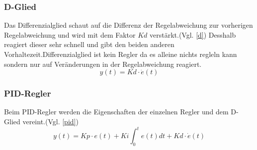 \documentclass[12pt,a4paper, ngerman]{article}
\begin{document}
\subsubsection{D-Glied}
Das Differenzialglied schaut auf die Differenz der Regelabweichung zur vorherigen Regelabweichung und wird mit dem Faktor $Kd$ verstärkt.(Vgl. \ref{d}) Desshalb reagiert dieser sehr schnell und gibt den beiden anderen Vorhaltezeit.Differenzialglied ist kein Regler da es alleine nichts regleln kann sondern nur auf Veränderungen in der Regelabweichung reagiert.\cite{website:rn-wissen_Regelungstechnik}\\
\begin{equation}\label{d}
y(t)=Kd\cdot \dot{e}(t)
\end{equation}

\subsubsection{PID-Regler}
Beim PID-Regler werden die Eigenschaften der einzelnen Regler und dem D-Glied vereint.(Vgl. \ref{pid})
\begin{equation}\label{pid}
y(t)=Kp\cdot e(t)+Ki\int_{0}^{t}e(t)dt+Kd\cdot \dot{e}(t)
\end{equation}
\newpage
\end{document}
